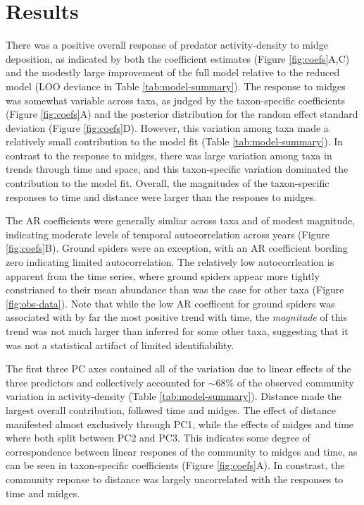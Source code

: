 

\section*{Results}

There was a positive overall response of predator activity-density to midge deposition,
as indicated by both the coefficient estimates (Figure \ref{fig:coefs}A,C)
and the modestly large improvement of the full model
relative to the reduced model (LOO deviance in Table \ref{tab:model-summary}).
The response to midges was somewhat variable across taxa,
as judged by the taxon-specific coefficients (Figure \ref{fig:coefs}A)
and the posterior distribution
for the random effect standard deviation (Figure \ref{fig:coefs}D).
However, this variation among taxa made a relatively small contribution
to the model fit (Table \ref{tab:model-summary}).
In contrast to the response to midges,
there was large variation among taxa in trends through time and space,
and this taxon-specific variation dominated the contribution to the model fit.
Overall, the magnitudes of the taxon-specific responses to time and distance
were larger than the respones to midges.

The AR coefficients were generally simliar across taxa and of modest magnitude,
indicating moderate levels of temporal autocorrelation across years
(Figure \ref{fig:coefs}B).
Ground spiders were an exception,
with an AR coefficient bording zero indicating limited autocorrelation.
The relatively low autocorrleation is apparent from the time series,
where ground spiders appear more tightly constrianed to their mean abundance
than was the case for other taxa (Figure \ref{fig:obs-data}).
Note that while the low AR coefficent for ground spiders was associated
with by far the most positive trend with time,
the \textit{magnitude} of this trend was not much larger than inferred for some other taxa,
suggesting that it was not a statistical artifact of limited identifiability.

The first three PC axes contained all of the variation
due to linear effects of the three predictors and
collectively accounted for $\sim$68\% of the observed community variation
in activity-density (Table \ref{tab:model-summary}).
Distance made the largest overall contribution,
followed time and midges.
The effect of distance manifested almost exclusively through PC1,
while the effects of midges and time where both split between PC2 and PC3.
This indicates some degree of correspondence between linear respones of the community
to midges and time, as can be seen in taxon-specific coefficients
(Figure \ref{fig:coefs}A).
In constrast, the community reponse to distance
was largely uncorrelated with the responses to time and midges.

